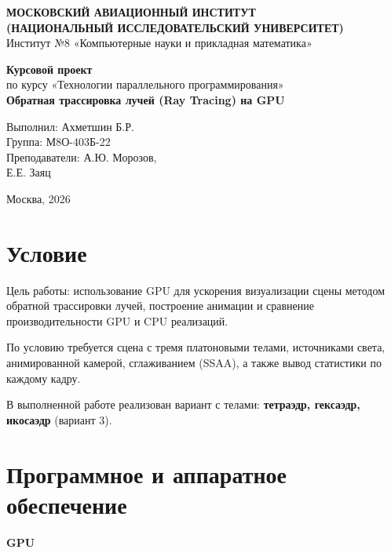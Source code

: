 \documentclass[a4paper,14pt]{extarticle}
\begin{document}
\begin{titlepage}
\begin{center}
\textbf{МОСКОВСКИЙ АВИАЦИОННЫЙ ИНСТИТУТ}\\
\textbf{(НАЦИОНАЛЬНЫЙ ИССЛЕДОВАТЕЛЬСКИЙ УНИВЕРСИТЕТ)}\\
Институт №8 «Компьютерные науки и прикладная математика»
\end{center}

\vspace{3.5cm}
\begin{center}
\textbf{\Large Курсовой проект}\\
\vspace{0.3cm}
по курсу «Технологии параллельного программирования»\\
\vspace{0.8cm}
\textbf{Обратная трассировка лучей (Ray Tracing) на GPU}
\end{center}

\vspace{4cm}
\begin{flushright}
Выполнил: Ахметшин Б.Р.\\
Группа: М8О-403Б-22\\
Преподаватели: А.Ю. Морозов,\\
\hspace*{3.6cm} Е.Е. Заяц
\end{flushright}

\vfill
\begin{center}
Москва, 2026
\end{center}
\end{titlepage}

\section*{Условие}
Цель работы: использование GPU для ускорения визуализации сцены методом
обратной трассировки лучей, построение анимации и сравнение производительности
GPU и CPU реализаций.

По условию требуется сцена с тремя платоновыми телами, источниками света,
анимированной камерой, сглаживанием (SSAA), а также вывод статистики
по каждому кадру.

В выполненной работе реализован вариант с телами:
\textbf{тетраэдр, гексаэдр, икосаэдр} (вариант 3).

\section*{Программное и аппаратное обеспечение}
\textbf{GPU}
\end{document}
